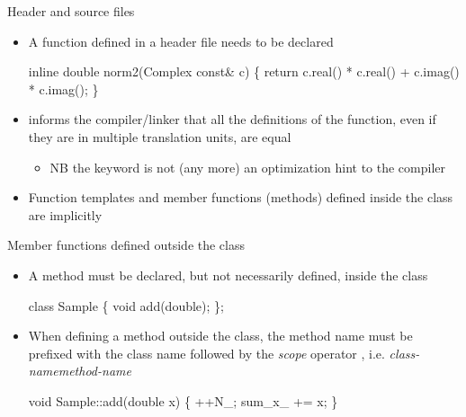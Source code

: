 \begin{frame}[fragile]{Header and source files \insertcontinuationtext}

  \begin{itemize}[<+->]
  \item A function defined in a header file needs to be declared
    \textbf{}
    \begin{codeblock}
\alert{inline} double norm2(Complex const& c)
\{
  return c.real() * c.real() + c.imag() * c.imag();
\}\end{codeblock}

  \item {} informs the compiler/linker that all the
    definitions of the function, even if they are in multiple
    translation units, are equal
    \begin{itemize}
    \item NB the  keyword is not (any more) an
      optimization hint to the compiler
    \end{itemize}
  \item Function templates and member functions (methods) defined
    inside the class are implicitly 
  \end{itemize}

\end{frame}

\begin{frame}[fragile]{Member functions defined outside the class}

  \begin{itemize}

  \item A method must be declared, but not necessarily defined, inside the class

    \begin{codeblock}
class Sample \{
  \ddd
  void add(double);
\};\end{codeblock}

  \item When defining a method outside the class, the method name must be
    prefixed with the class name followed by the \textit{scope} operator
    \code{::}, i.e. \textit{class-name}\code{::}\textit{method-name}

    \begin{codeblock}
void Sample::add(double x) \{
  ++N_;
  sum_x_ += x;
  \ddd
\}\end{codeblock}

  \end{itemize}

\end{frame}

